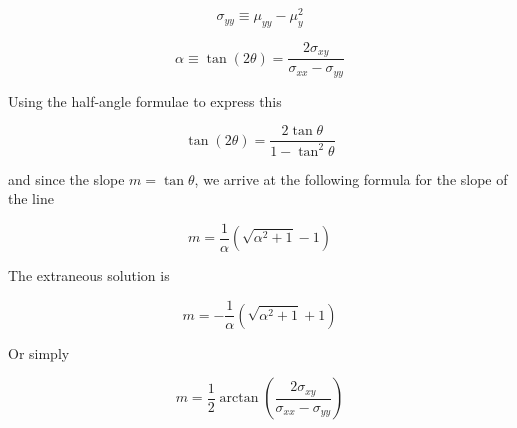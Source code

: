\documentclass{article}
\newcommand{\meanysquared}{\ensuremath{\mu_{y}^{2}}}
\newcommand{\meanyy}{\ensuremath{\mu_{yy}}}
\newcommand{\sxx}{\ensuremath{\sigma_{xx}}}
\newcommand{\sxy}{\ensuremath{\sigma_{xy}}}
\newcommand{\syy}{\ensuremath{\sigma_{yy}}}
\begin{document}
\begin{equation}
\syy \equiv \meanyy - \meanysquared
\end{equation}

\begin{equation}
\alpha \equiv \tan \left( 2 \theta \right) = \frac{2 \sxy}{\sxx - \syy}
\end{equation}

Using the half-angle formulae to express this

\begin{equation}
\tan \left( 2 \theta \right) = \frac{2 \tan \theta}{1 - \tan^{2} \theta}
\end{equation}

and since the slope $m = \tan \theta $, we arrive at the following formula for the slope of the line

\begin{equation}
m = \frac{1}{\alpha} \left( \sqrt{\alpha^{2} + 1} - 1\right)
\end{equation}

The extraneous solution is

\begin{equation}
m = - \frac{1}{\alpha} \left( \sqrt{\alpha^{2} + 1} + 1\right)
\end{equation}

Or simply

\begin{equation}
m = \frac{1}{2} \arctan \left( \frac{2 \sxy}{\sxx - \syy} \right)
\end{equation}
\end{document}
